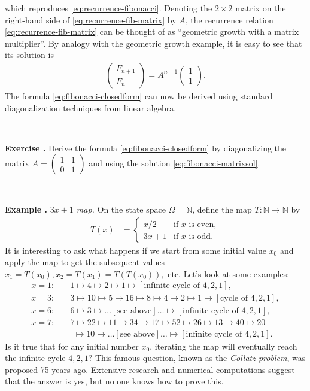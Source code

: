 \documentclass[12pt]{amsart}
\newcommand{\eq}[1]{\begin{equation}\begin{split}#1\end{split}\end{equation}}
\newcommand{\eqst}[1]{\begin{align*}#1\end{align*}}
\newcounter{example}
\newcounter{exercise}
\newcommand{\beginexample}[1]{\ \\ \addtocounter{example}{1} \textbf{Example \arabic{example}.} \textit{#1.}}
\newcommand{\beginexer}{\ \\ \addtocounter{exercise}{1} \textbf{Exercise \arabic{exercise}.} }
\begin{document}
which reproduces \eqref{eq:recurrence-fibonacci}. Denoting the $2\times 2$ matrix on the right-hand side of \eqref{eq:recurrence-fib-matrix} by $A$, the recurrence relation \eqref{eq:recurrence-fib-matrix} can be thought of as ``geometric growth with a matrix multiplier''. By analogy with the geometric growth example, it is easy to see that its solution is
\eq{ \label{eq:fibonacci-matrixsol}
\left(\begin{array}{c}
F_{n+1}\\F_n 
\end{array}\right) = A^{n-1} 
\left(\begin{array}{c}
1\\1
\end{array}\right).
}
The formula \eqref{eq:fibonacci-closedform} can now be derived using standard diagonalization techniques from linear algebra.

\beginexer Derive the formula \eqref{eq:fibonacci-closedform} by diagonalizing the matrix $A=\left(\begin{array}{cc} 1&1\\0&1\end{array}\right)$ and using the solution \eqref{eq:fibonacci-matrixsol}.

\beginexample{$3x+1$ map} On the state space $\Omega=\mathbb{N}$, define the map $T:\mathbb{N}\to\mathbb{N}$ by
\eqst{
T(x) &= \begin{cases} x/2 & \textrm{if $x$ is even}, \\ 3x+1 & \textrm{if $x$ is odd}.
\end{cases}
}
It is interesting to ask what happens if we start from some initial value $x_0$ and apply the map to get the subsequent values $x_1=T(x_0), x_2=T(x_1)=T(T(x_0)),$ etc. Let's look at some examples:
\eqst{
x=1: \quad & 1\mapsto 4 \mapsto 2 \mapsto 1 \mapsto [\textrm{infinite cycle of }4,2,1], \\
x=3: \quad & 3\mapsto 10\mapsto 5\mapsto 16\mapsto 8 \mapsto 4 \mapsto2\mapsto 1 \mapsto
[\textrm{cycle of }4,2,1], \\
x=6: \quad & 6 \mapsto 3 \mapsto \ldots[\textrm{see above}] \ldots \mapsto [\textrm{infinite cycle of }4,2,1], \\
x=7: \quad & 7 \mapsto 22\mapsto 11\mapsto 34\mapsto 17\mapsto 52\mapsto 26\mapsto13\mapsto40
\mapsto20 \\ & \ \,\mapsto10\mapsto \ldots[\textrm{see above}] \ldots \mapsto [\textrm{infinite cycle of }4,2,1].
}
Is it true that for any initial number $x_0$, iterating the map will eventually reach the infinite cycle $4,2,1$? This famous question, known as the \emph{Collatz problem}, was proposed 75 years ago. Extensive research and numerical computations suggest that the answer is yes, but no one knows how to prove this.
\end{document}

